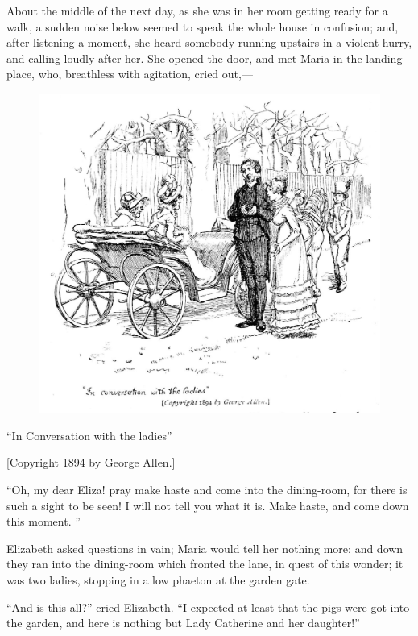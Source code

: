 \documentclass[10pt]{book}
\begin{document}
   About the middle of the next day, as she was in her room getting ready
for a walk, a sudden noise below seemed to speak the whole house in
confusion; and, after listening a moment, she heard somebody running
upstairs in a violent hurry, and calling loudly after her. She opened
the door, and met Maria in the landing-place, who, breathless with
agitation, cried out,—
  

\begin{figure}[h]
\centering
\includegraphics[width=\linewidth]{images/i_227.jpg}
\end{figure}

      “In Conversation with the ladies”
     

     [Copyright 1894 by George Allen.]
    

   “Oh, my dear Eliza! pray make haste and come into the dining-room, for
there is such a sight to be seen! I will not tell you what it is. Make
haste, and come down this moment.
   ”
  

   Elizabeth asked questions in vain; Maria would tell her nothing more;
and down they ran into the dining-room which fronted the lane, in quest
of this wonder; it was two ladies, stopping in a low phaeton at the
garden gate.
  

   “And is this all?” cried Elizabeth. “I expected at least that the pigs
were got into the garden, and here is nothing but Lady Catherine and her
daughter!”
  
\end{document}
